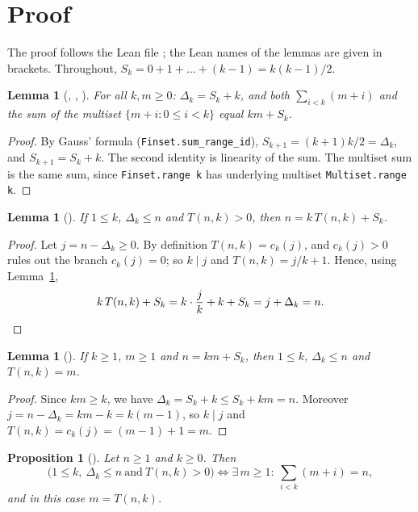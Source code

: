 \documentclass[11pt]{amsart}
\theoremstyle{plain}
\newtheorem{lemma}[theorem]{Lemma}
\newtheorem{proposition}[theorem]{Proposition}
\theoremstyle{definition}
\begin{document}
\section{Proof}\label{sec:proof}

The proof follows the Lean file ; the Lean names of the lemmas are given in brackets. Throughout, $S_k=0+1+\dots+(k-1)=k(k-1)/2$.

\begin{lemma}[, , ]\label{lem:sums}
For all $k,m\ge0$: $\Delta_k=S_k+k$, and both $\sum_{i<k}(m+i)$ and the sum of the multiset $\{m+i:0\le i<k\}$ equal $km+S_k$.
\end{lemma}

\begin{proof}
By Gauss' formula (\texttt{Finset.sum\_range\_id}), $S_{k+1}=(k+1)k/2=\Delta_k$, and $S_{k+1}=S_k+k$. The second identity is linearity of the sum. The multiset sum is the same sum, since \texttt{Finset.range k} has underlying multiset \texttt{Multiset.range k}.
\end{proof}

\begin{lemma}[]\label{lem:fwd}
If $1\le k$, $\Delta_k\le n$ and $T(n,k)>0$, then $n=k\,T(n,k)+S_k$.
\end{lemma}

\begin{proof}
Let $j=n-\Delta_k\ge0$. By definition $T(n,k)=c_k(j)$, and $c_k(j)>0$ rules out the branch $c_k(j)=0$; so $k\mid j$ and $T(n,k)=j/k+1$. Hence, using Lemma~\ref{lem:sums},
\[
  k\,T(n,k)+S_k=k\cdot\frac jk+k+S_k=j+\Delta_k=n. \qedhere
\]
\end{proof}

\begin{lemma}[]\label{lem:bwd}
If $k\ge1$, $m\ge1$ and $n=km+S_k$, then $1\le k$, $\Delta_k\le n$ and $T(n,k)=m$.
\end{lemma}

\begin{proof}
Since $km\ge k$, we have $\Delta_k=S_k+k\le S_k+km=n$. Moreover $j=n-\Delta_k=km-k=k(m-1)$, so $k\mid j$ and $T(n,k)=c_k(j)=(m-1)+1=m$.
\end{proof}

\begin{proposition}[]\label{prop:support}
Let $n\ge1$ and $k\ge0$. Then
\[
  \bigl(1\le k,\ \Delta_k\le n\ \text{and}\ T(n,k)>0\bigr)\iff \exists\,m\ge1:\ \sum_{i<k}(m+i)=n ,
\]
and in this case $m=T(n,k)$.
\end{proposition}
\end{document}
